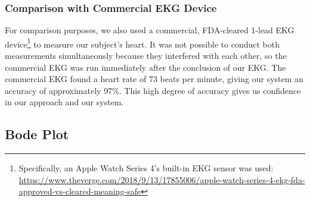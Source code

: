 \documentclass[11pt]{article}
\begin{document}
\subsubsection{Comparison with Commercial EKG Device}

For comparison purposes, we also used a commercial, FDA-cleared 1-lead EKG device\footnote{Specifically, an Apple Watch Series 4's built-in EKG sensor was used: \url{https://www.theverge.com/2018/9/13/17855006/apple-watch-series-4-ekg-fda-approved-vs-cleared-meaning-safe}} to measure our subject's heart. It was not possible to conduct both measurements simultaneously because they interfered with each other, so the commercial EKG was run immediately after the conclusion of our EKG. The commercial EKG found a heart rate of 73 beats per minute, giving our system an accuracy of approximately 97\%. This high degree of accuracy gives us confidence in our approach and our system.

\subsection{Bode Plot}
\end{document}

